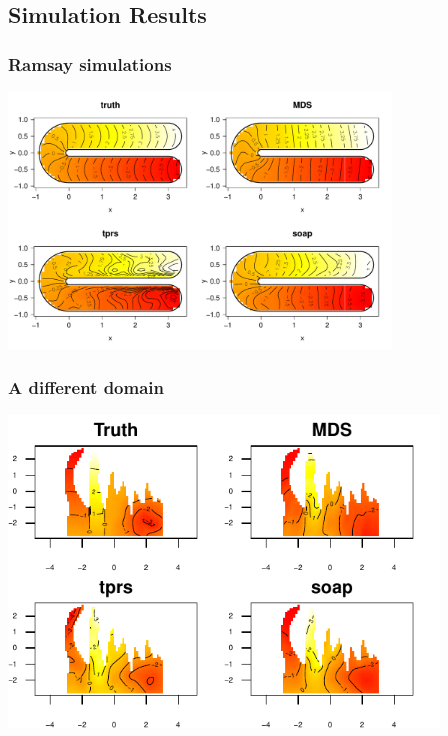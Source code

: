 \documentclass[ignorenonframetext]{beamer} %
\begin{document}
\subsection{Simulation Results}

\begin{frame}
	\frametitle{Ramsay simulations}
            \centering
              \includegraphics[width=4in]{figs/ramsay-low.pdf}\\
\end{frame}


\begin{frame}
	\frametitle{A different domain}
            \centering
              \includegraphics[width=4.5in]{figs/wt2-real.pdf}\\
\end{frame}
\end{document}
